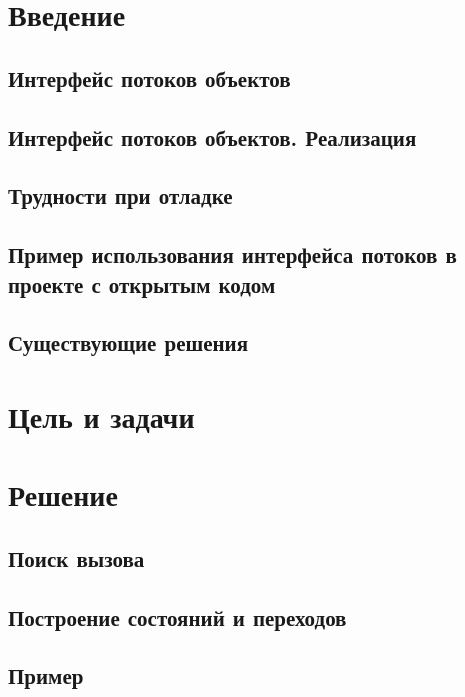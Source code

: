 

\section{Введение}

\subsection{Интерфейс потоков объектов}

\subsection{Интерфейс потоков объектов. Реализация}


\subsection{Трудности при отладке}

\subsection{Пример использования интерфейса потоков в проекте с открытым кодом}

\subsection{Существующие решения}

\section{Цель и задачи}

\section{Решение}
\subsection{Поиск вызова}

\subsection{Построение состояний и переходов}

\subsection{Пример}

